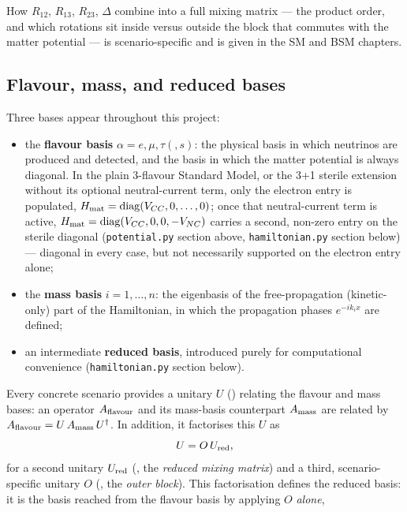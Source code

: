 \begin{theorybox}
How $R_{12}$, $R_{13}$, $R_{23}$, $\Delta$ combine into a full mixing matrix ---
the product order, and which rotations sit inside versus outside the block
that commutes with the matter potential --- is scenario-specific and is
given in the SM and BSM chapters.

\subsection*{Flavour, mass, and reduced bases}
Three bases appear throughout this project:
\begin{itemize}
  \item the \textbf{flavour basis} $\alpha=e,\mu,\tau(,s)$: the physical
    basis in which neutrinos are produced and detected, and the basis in
    which the matter potential is always diagonal. In the plain 3-flavour
    Standard Model, or the 3+1 sterile extension without its optional
    neutral-current term, only the electron entry is populated,
    $H_{\rm mat}=\operatorname{diag}(V_{CC},0,\dots,0)$; once that neutral-current term is
    active, $H_{\rm mat}=\operatorname{diag}(V_{CC},0,0,-V_{NC})$ carries a second,
    non-zero entry on the sterile diagonal (\texttt{potential.py} section
    above, \texttt{hamiltonian.py} section below) --- diagonal in every
    case, but not necessarily supported on the electron entry alone;
  \item the \textbf{mass basis} $i=1,\dots,n$: the eigenbasis of the
    free-propagation (kinetic-only) part of the Hamiltonian, in which the
    propagation phases $e^{-ik_ix}$ are defined;
  \item an intermediate \textbf{reduced basis}, introduced purely for
    computational convenience (\texttt{hamiltonian.py} section below).
\end{itemize}
Every concrete  scenario provides a unitary $U$
() relating the flavour and mass bases: an operator
$A_{\rm flavour}$ and its mass-basis counterpart $A_{\rm mass}$ are related
by $A_{\rm flavour} = U\,A_{\rm mass}\,U^\dagger$. In addition, it
factorises this $U$ as
\begin{equation}
  U = O\,U_{\rm red},
\end{equation}
for a second unitary $U_{\rm red}$ (, the \emph{reduced
mixing matrix}) and a third, scenario-specific unitary $O$
(, the \emph{outer block}). This factorisation defines
the reduced basis: it is the basis reached from the flavour basis by
applying $O$ \emph{alone},
\begin{equation}

\end{equation}
\end{theorybox}
